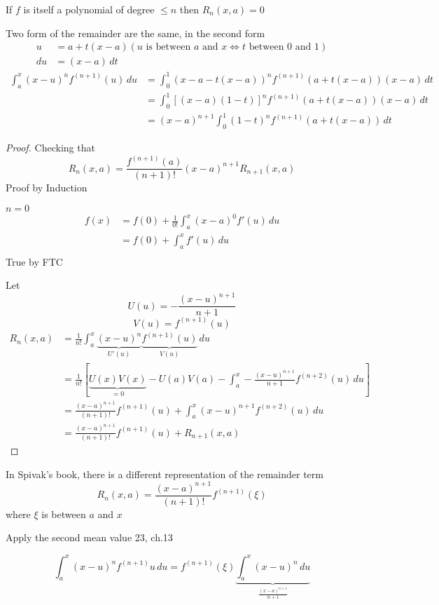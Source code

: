 If $f$ is itself a polynomial of degree $\le n$ then $R_n(x, a) = 0$

Two form of the remainder are the same, in the second form 
\begin{align*}
  u &= a + t(x-a) (u\text{ is between } a \text{ and } x \iff t \text{ between 0 and 1})\\ 
  du &= (x-a)\, dt
\end{align*}
\begin{align*}
  \int_a^x(x-u)^nf^{(n+1)}(u)\, du &= \int_0^1(x-a -t(x-a))^nf^{(n+1)}(a + t(x-a))(x-a)\, dt \\ 
  &= \int_0^1\left[(x-a)(1-t)\right]^nf^{(n+1)}(a + t(x-a))(x-a)\, dt \\
  &= (x-a)^{n+1} \int_0^1(1-t)^nf^{(n+1)}(a + t(x-a))\, dt
\end{align*}

\begin{proof}
  Checking that 
  \[R_n(x, a) = \frac{f^{(n+1)}(a)}{(n+1)!}(x-a)^{n+1} R_{n+1}(x, a)\]
  Proof by Induction

  $n = 0$
  \begin{align*}
    f(x) &= f(0) + \frac{1}{0!}\int_a^x(x-a)^0f'(u)\, du\\
    &= f(0) + \int_a^x f'(u) \, du\\
  \end{align*}
  True by FTC

  Let
  \[U(u) = -\frac{(x-u)^{n+1}}{n+1}\]
  \[V(u) = f^{(n+1)}(u)\]
  \begin{align*}
    R_n(x, a) &= \frac{1}{n!}\int_a^x\underbrace{(x-u)^n}_{U'(u)}\underbrace{f^{(n+1)}(u)}_{V(u)}\, du\\
    &= \frac{1}{n!}\left[\underbrace{U(x)V(x)}_{=0}-U(a)V(a) -\int_a^x-\frac{(x-u)^{n+1}}{n+1}f^{(n+2)}(u)\, du\right] \\
    &= \frac{(x-a)^{n+1}}{(n+1)!}f^{(n+1)}(u) + \int_a^x (x-u)^{n+1}f^{(n+2)}(u)\, du \\
    &=  \frac{(x-a)^{n+1}}{(n+1)!}f^{(n+1)}(u) + R_{n+1}(x, a) 
  \end{align*}
\end{proof}

In Spivak's book, there is a different representation of the remainder term
\[R_n(x, a) = \frac{(x-a)^{n+1}}{(n+1)!}f^{(n+1)}(\xi)\]
where $\xi$ is between $a$ and $x$

Apply the second mean value 23, ch.13

\[\int_a^x (x-u)^nf^{(n+1)}u\, du = f^{(n+1)}(\xi) \underbrace{\int_a^x (x-u)^n \, du}_{\frac{(x-a)^{n+1}}{n+1}}\]